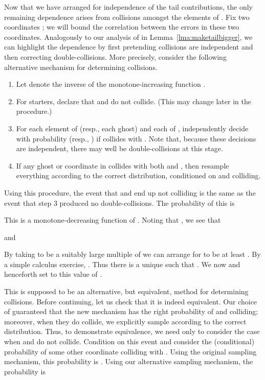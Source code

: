 \documentclass[letterpaper,11pt]{article}
\begin{document}
Now that we have arranged for independence of the tail
contributions, the only remaining dependence arises from collisions
amongst the elements of .  Fix two coordinates ;
we will bound the correlation between the errors in
these two coordinates.  Analogously to our analysis of
 in Lemma~\ref{lma:maketailbigger}, we can highlight
the dependence by first pretending collisions are independent
and then correcting double-collisions.  More precisely,
consider the following alternative mechanism for determining
collisions.
\begin{enumerate}
\item  Let 
denote the inverse of the monotone-increasing function .
\item For starters, declare that  and  do not collide.  (This may change later
in the procedure.)
\item For each element  of  (resp., each ghost)
and each of , independently decide with
probability  (resp., )
if  collides with .  Note that, because these decisions are independent,
there may well be double-collisions at this stage.
\item If any ghost or coordinate in  collides with both
 and , then resample everything according to
the correct distribution, conditioned on  and  colliding.
\end{enumerate}

Using this procedure, the event that  and  end up not colliding is
the same as the event that step 3 produced no double-collisions.  The
probability of this is

This is a monotone-decreasing function of .  Noting that
, we see that

and

By taking  to be a suitably large multiple of  we can
arrange for  to be at least .
By a simple calculus exercise, .
Thus there is a unique  such that
.  We now and henceforth set  to
this value of .

This is supposed to be an alternative, but equivalent,
method for determining collisions.  Before continuing, let
us check that it is indeed equivalent.  Our choice of
 guaranteed that the new mechanism has the
right probability of  and  colliding; moreover,
when they do collide, we explicitly sample according to
the correct distribution.  Thus, to demonstrate equivalence,
we need only to consider the case when  and  do not
collide.  Condition on this event and consider the
(conditional) probability of some other coordinate
 colliding
with .  Using the original sampling mechanism, this probability
is .  Using our alternative sampling mechanism, the probability is
\end{document}

